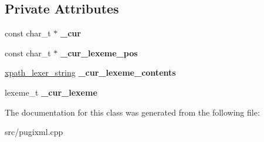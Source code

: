 \subsection*{Private Attributes}
\begin{DoxyCompactItemize}
\item 
\mbox{\label{classxpath__lexer_af1c8627ba8f2522ce4bd81dce1899f52}} 
const char\+\_\+t $\ast$ {\bfseries \+\_\+cur}
\item 
\mbox{\label{classxpath__lexer_a01e5586ea5b1bfa456cd5318bad9f793}} 
const char\+\_\+t $\ast$ {\bfseries \+\_\+cur\+\_\+lexeme\+\_\+pos}
\item 
\mbox{\label{classxpath__lexer_a7fa3402e23b860db2386b00995e69d20}} 
\hyperlink{structxpath__lexer__string}{xpath\+\_\+lexer\+\_\+string} {\bfseries \+\_\+cur\+\_\+lexeme\+\_\+contents}
\item 
\mbox{\label{classxpath__lexer_a29b63ce861f781e1aa00763ad1dcb6cf}} 
lexeme\+\_\+t {\bfseries \+\_\+cur\+\_\+lexeme}
\end{DoxyCompactItemize}


The documentation for this class was generated from the following file\+:\begin{DoxyCompactItemize}
\item 
src/pugixml.\+cpp\end{DoxyCompactItemize}
